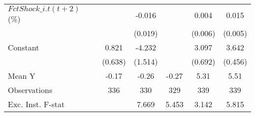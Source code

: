 {\begin{tabular}{l*{5}{c}}
\addlinespace
$ FctShock\_{i.t}(t+2)$ (\%)&                     &      -0.016         &                     &       0.004         &       0.015\sym{***}\\
                    &                     &     (0.019)         &                     &     (0.006)         &     (0.005)         \\
\addlinespace
Constant            &       0.821         &      -4.232\sym{***}&                     &       3.097\sym{***}&       3.642\sym{***}\\
                    &     (0.638)         &     (1.514)         &                     &     (0.692)         &     (0.456)         \\
\midrule
Mean Y              &       -0.17         &       -0.26         &       -0.27         &        5.31         &        5.51         \\
Observations        &         336         &         330         &         329         &         339         &         339         \\
Exc. Inst. F-stat   &                     &       7.669         &       5.453         &       3.142         &       5.815         \\
\bottomrule
\end{tabular}
}
